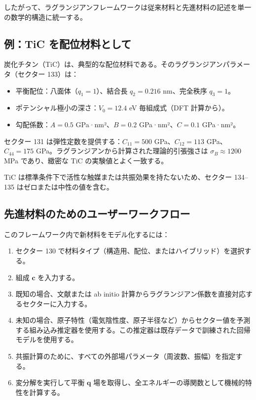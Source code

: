 \documentclass[11pt,a4paper]{article}
\theoremstyle{remark}
\begin{document}
	したがって、ラグランジアンフレームワークは従来材料と先進材料の記述を単一の数学的構造に統一する。
	
	\subsection{例：TiC を配位材料として}
	\label{subsec:example-tic}
	
	炭化チタン（TiC）は、典型的な配位材料である。そのラグランジアンパラメータ（セクター 133）は：
	
	\begin{itemize}
		\item 平衡配位：八面体（\(q_1=1\)）、結合長 \(q_2 = 0.216\) nm、完全秩序 \(q_3=1\)。
		\item ポテンシャル極小の深さ：\(V_0 = 12.4\) eV 毎組成式（DFT 計算から）。
		\item 勾配係数：\(A=0.5\) GPa·nm²、\(B=0.2\) GPa·nm²、\(C=0.1\) GPa·nm²。
	\end{itemize}
	
	セクター 131 は弾性定数を提供する：\(C_{11}=500\) GPa、\(C_{12}=113\) GPa、\(C_{44}=175\) GPa。ラグランジアンから計算された理論的引張強さは \(\sigma_B \approx 1200\) MPa であり、緻密な TiC の実験値とよく一致する。
	
	TiC は標準条件下で活性な触媒または共振効果を持たないため、セクター 134–135 はゼロまたは中性の値を含む。
	
	\subsection{先進材料のためのユーザーワークフロー}
	\label{subsec:workflow}
	
	このフレームワーク内で新材料をモデル化するには：
	
	\begin{enumerate}
		\item セクター 130 で材料タイプ（構造用、配位、またはハイブリッド）を選択する。
		\item 組成 \(\mathbf{c}\) を入力する。
		\item 既知の場合、文献または ab initio 計算からラグランジアン係数を直接対応するセクターに入力する。
		\item 未知の場合、原子特性（電気陰性度、原子半径など）からセクター値を予測する組み込み推定器を使用する。この推定器は既存データで訓練された回帰モデルを使用する。
		\item 共振計算のために、すべての外部場パラメータ（周波数、振幅）を指定する。
		\item 変分解を実行して平衡 \(\mathbf{q}\) 場を取得し、全エネルギーの導関数として機械的特性を計算する。
	\end{enumerate}
	
\end{document}
